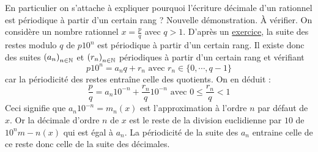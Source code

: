 

En particulier on s'attache à expliquer pourquoi l'écriture décimale d'un rationnel est périodique à partir d'un certain rang ?
Nouvelle démonstration. \`A vérifier.
On considère un nombre rationnel $x=\frac{p}{q}$ avec $q>1$. D'après un \href{http://localhost/v-1/index.php?act=chelt&id_elt=5639}{exercice}, la suite des restes modulo $q$ de $p10^n$ est périodique à partir d'un certain rang. Il existe donc des suites $\left(a_n \right)_{n\in\mathbb{N}}$ et $\left(r_n\right)_{n\in\mathbb{N}}$ périodiques à partir d'un certain rang et vérifiant
\begin{displaymath}
 p10^n = a_nq + r_n \text{ avec } r_n\in\{0,\cdots,q-1\}
\end{displaymath}
car la périodicité des restes entraîne celle des quotients. On en déduit :
\begin{displaymath}
 \dfrac{p}{q} = a_n10^{-n} + \dfrac{r_n}{q}10^{-n} \text{ avec } 0\leq \dfrac{r_n}{q}<1
\end{displaymath}
Ceci signifie que $a_n10^{-n}=m_n(x)$ est l'approximation à l'ordre $n$ par défaut de $x$. Or la décimale d'ordre $n$ de $x$ est le reste de la division euclidienne par $10$ de $10^nm-n(x)$ qui est égal à $a_n$. La périodicité de la suite des $a_n$ entraine celle de ce reste donc celle de la suite des décimales.


